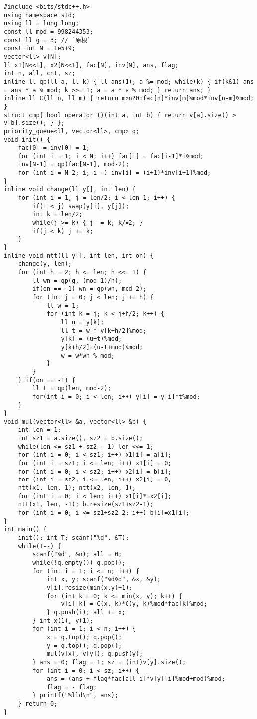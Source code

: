 \begin{lstlisting}
#include <bits/stdc++.h>
using namespace std;
using ll = long long;
const ll mod = 998244353;
const ll g = 3; // `原根`
const int N = 1e5+9;
vector<ll> v[N];
ll x1[N<<1], x2[N<<1], fac[N], inv[N], ans, flag;
int n, all, cnt, sz;
inline ll qp(ll a, ll k) { ll ans(1); a %= mod; while(k) { if(k&1) ans = ans * a % mod; k >>= 1; a = a * a % mod; } return ans; }
inline ll C(ll n, ll m) { return m>n?0:fac[n]*inv[m]%mod*inv[n-m]%mod; }
struct cmp{ bool operator ()(int a, int b) { return v[a].size() > v[b].size(); } };
priority_queue<ll, vector<ll>, cmp> q;
void init() {
    fac[0] = inv[0] = 1;
    for (int i = 1; i < N; i++) fac[i] = fac[i-1]*i%mod;
    inv[N-1] = qp(fac[N-1], mod-2);
    for (int i = N-2; i; i--) inv[i] = (i+1)*inv[i+1]%mod;
}
inline void change(ll y[], int len) {
    for (int i = 1, j = len/2; i < len-1; i++) {
        if(i < j) swap(y[i], y[j]);
        int k = len/2;
        while(j >= k) { j -= k; k/=2; }
        if(j < k) j += k;
    }
}
inline void ntt(ll y[], int len, int on) {
    change(y, len);
    for (int h = 2; h <= len; h <<= 1) {
        ll wn = qp(g, (mod-1)/h);
        if(on == -1) wn = qp(wn, mod-2);
        for (int j = 0; j < len; j += h) {
            ll w = 1;
            for (int k = j; k < j+h/2; k++) {
                ll u = y[k];
                ll t = w * y[k+h/2]%mod;
                y[k] = (u+t)%mod;
                y[k+h/2]=(u-t+mod)%mod;
                w = w*wn % mod;
            }
        }
    } if(on == -1) {
        ll t = qp(len, mod-2);
        for(int i = 0; i < len; i++) y[i] = y[i]*t%mod;
    }
}
void mul(vector<ll> &a, vector<ll> &b) {
    int len = 1;
    int sz1 = a.size(), sz2 = b.size();
    while(len <= sz1 + sz2 - 1) len <<= 1;
    for (int i = 0; i < sz1; i++) x1[i] = a[i];
    for (int i = sz1; i <= len; i++) x1[i] = 0;
    for (int i = 0; i < sz2; i++) x2[i] = b[i];
    for (int i = sz2; i <= len; i++) x2[i] = 0;
    ntt(x1, len, 1); ntt(x2, len, 1);
    for (int i = 0; i < len; i++) x1[i]*=x2[i];
    ntt(x1, len, -1); b.resize(sz1+sz2-1);
    for (int i = 0; i <= sz1+sz2-2; i++) b[i]=x1[i];
}
int main() {
    init(); int T; scanf("%d", &T);
    while(T--) {
        scanf("%d", &n); all = 0;
        while(!q.empty()) q.pop();
        for (int i = 1; i <= n; i++) {
            int x, y; scanf("%d%d", &x, &y);
            v[i].resize(min(x,y)+1);
            for (int k = 0; k <= min(x, y); k++) {
                v[i][k] = C(x, k)*C(y, k)%mod*fac[k]%mod;
            } q.push(i); all += x;
        } int x(1), y(1);
        for (int i = 1; i < n; i++) {
            x = q.top(); q.pop();
            y = q.top(); q.pop();
            mul(v[x], v[y]); q.push(y);
        } ans = 0; flag = 1; sz = (int)v[y].size();
        for (int i = 0; i < sz; i++) {
            ans = (ans + flag*fac[all-i]*v[y][i]%mod+mod)%mod;
            flag = - flag;
        } printf("%lld\n", ans);
    } return 0;
}
\end{lstlisting}


